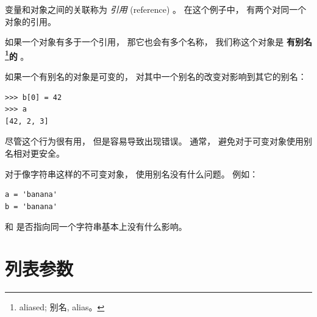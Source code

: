 变量和对象之间的关联称为 {\em 引用} (reference) 。
在这个例子中， 有两个对同一个对象的引用。



如果一个对象有多于一个引用， 那它也会有多个名称，
我们称这个对象是 {\bf 有别名\footnote{aliased; 别名, alias。}的} 。



如果一个有别名的对象是可变的， 对其中一个别名的改变对影响到其它的别名：

\begin{lstlisting}
>>> b[0] = 42
>>> a
[42, 2, 3]
\end{lstlisting}

%

尽管这个行为很有用， 但是容易导致出现错误。
通常， 避免对于可变对象使用别名相对更安全。



对于像字符串这样的不可变对象， 使用别名没有什么问题。  例如：

\begin{lstlisting}
a = 'banana'
b = 'banana'
\end{lstlisting}

%

 和  是否指向同一个字符串基本上没有什么影响。


\section{列表参数}
\label{list.arguments}
  
  

